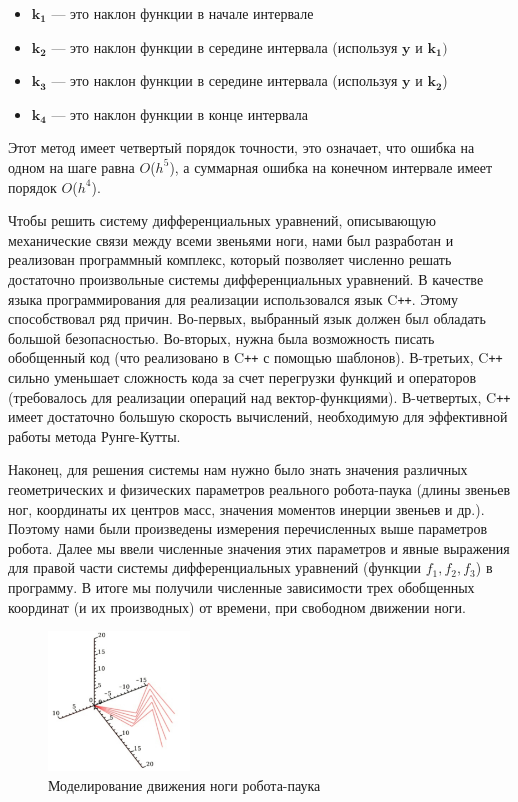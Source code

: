 \documentclass{article}
\begin{document}
\begin{itemize}
    \item $\boldsymbol{k_1}$ --- это наклон функции в начале интервале
    \item $\boldsymbol{k_2}$ --- это наклон функции в середине интервала (используя $\boldsymbol{y}$ и $\boldsymbol{k_1})$
    \item $\boldsymbol{k_3}$ --- это наклон функции в середине интервала (используя $\boldsymbol{y}$ и $\boldsymbol{k_2}$)
    \item $\boldsymbol{k_4}$ --- это наклон функции в конце интервала
\end{itemize}

Этот метод имеет четвертый порядок точности, это означает, что ошибка на одном на шаге равна $O$($h^5$), а суммарная ошибка на конечном интервале имеет порядок $O$($h^4$).

Чтобы решить систему дифференциальных уравнений, описывающую механические связи между всеми звеньями ноги, нами был разработан и реализован программный комплекс, который позволяет численно решать достаточно произвольные системы дифференциальных уравнений. В качестве языка программирования для реализации использовался язык C\texttt{++}. Этому способствовал ряд причин. Во-первых, выбранный язык должен был обладать большой безопасностью. Во-вторых, нужна была возможность писать обобщенный код (что реализовано в C\texttt{++} с помощью шаблонов). В-третьих, C\texttt{++} сильно уменьшает сложность кода за счет перегрузки функций и операторов (требовалось для реализации операций над вектор-функциями). В-четвертых, C\texttt{++} имеет достаточно большую скорость вычислений, необходимую для эффективной работы метода Рунге-Кутты.

Наконец, для решения системы нам нужно было знать значения различных геометрических и физических параметров реального робота-паука (длины звеньев ног, координаты их центров масс, значения моментов инерции звеньев и др.). Поэтому нами были произведены измерения перечисленных выше параметров робота. Далее мы ввели численные значения этих параметров и явные выражения для правой части системы дифференциальных уравнений (функции $f_1, f_2, f_3$) в программу. В итоге мы получили численные зависимости трех обобщенных координат (и их производных) от времени, при свободном движении ноги.

\begin{figure}[H]
\centering
\includegraphics[height=10em]{images/leg_modeling.jpg}
\caption{Моделирование движения ноги робота-паука}
\label{fig:leg_modeling}
\end{figure}
\end{document}

